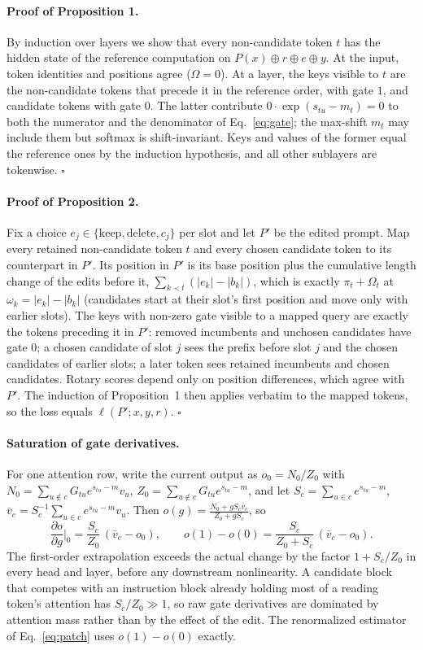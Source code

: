 \documentclass{article}
\begin{document}
\paragraph{Proof of Proposition 1.} By induction over layers we show that every
non-candidate token $t$ has the hidden state of the reference computation on
$P(x)\oplus r\oplus e\oplus y$. At the input, token identities and positions agree
($\Omega=0$). At a layer, the keys visible to $t$ are the non-candidate tokens that
precede it in the reference order, with gate $1$, and candidate tokens with gate
$0$. The latter contribute $0\cdot\exp(s_{tu}-m_t)=0$ to both the numerator and the
denominator of Eq.~\ref{eq:gate}; the max-shift $m_t$ may include them but softmax
is shift-invariant. Keys and values of the former equal the reference ones by the
induction hypothesis, and all other sublayers are tokenwise. \hfill$\square$

\paragraph{Proof of Proposition 2.} Fix a choice $e_j\in\{\text{keep},\text{delete},c_j\}$
per slot and let $P'$ be the edited prompt. Map every retained non-candidate token
$t$ and every chosen candidate token to its counterpart in $P'$. Its position in
$P'$ is its base position plus the cumulative length change of the edits before
it, $\sum_{k\prec t}(|e_k|-|b_k|)$, which is exactly $\pi_t+\Omega_t$ at
$\omega_k=|e_k|-|b_k|$ (candidates start at their slot's first position and move
only with earlier slots). The keys with non-zero gate visible to a mapped query are
exactly the tokens preceding it in $P'$: removed incumbents and unchosen
candidates have gate $0$; a chosen candidate of slot $j$ sees the prefix before
slot $j$ and the chosen candidates of earlier slots; a later token sees retained
incumbents and chosen candidates. Rotary scores depend only on position
differences, which agree with $P'$. The induction of Proposition~1 then applies
verbatim to the mapped tokens, so the loss equals $\ell(P';x,y,r)$. \hfill$\square$

\paragraph{Saturation of gate derivatives.} For one attention row, write the
current output as $o_0=N_0/Z_0$ with $N_0=\sum_{u\notin c}G_{tu}e^{s_{tu}-m}v_u$,
$Z_0=\sum_{u\notin c}G_{tu}e^{s_{tu}-m}$, and let $S_c=\sum_{u\in c}e^{s_{tu}-m}$,
$\bar v_c=S_c^{-1}\sum_{u\in c}e^{s_{tu}-m}v_u$. Then
$o(g)=\frac{N_0+gS_c\bar v_c}{Z_0+gS_c}$, so
\begin{equation*}
\frac{\partial o}{\partial g}\Big|_{0}=\frac{S_c}{Z_0}\,(\bar v_c-o_0),\qquad
o(1)-o(0)=\frac{S_c}{Z_0+S_c}\,(\bar v_c-o_0).
\end{equation*}
The first-order extrapolation exceeds the actual change by the factor
$1+S_c/Z_0$ in every head and layer, before any downstream nonlinearity. A
candidate block that competes with an instruction block already holding most of a
reading token's attention has $S_c/Z_0\gg1$, so raw gate derivatives are dominated
by attention mass rather than by the effect of the edit. The renormalized estimator
of Eq.~\ref{eq:patch} uses $o(1)-o(0)$ exactly.
\end{document}
